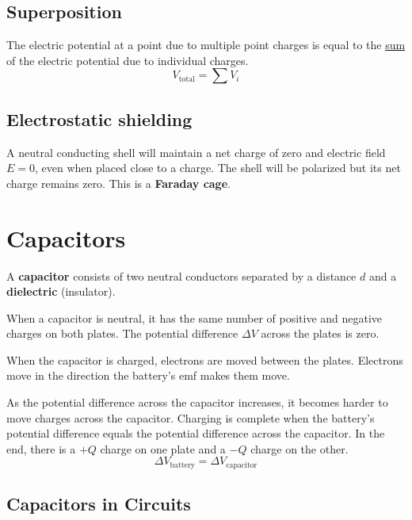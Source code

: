 \documentclass{article}
\newcommand{\definition}[1]{\begin{tcolorbox}[colback=red!5!white,colframe=red!75!black,parbox=false] #1 \end{tcolorbox}}
\newcommand{\theorem}[2]{\begin{tcolorbox}[title={#1},colback=blue!5!white,colframe=blue!75!black,parbox=false] #2 \end{tcolorbox}}
\begin{document}
\subsection{Superposition}

\theorem{Superposition}{
	The electric potential at a point due to multiple point charges is equal to the \ul{sum} of the electric potential due to individual charges.
	\begin{equation*}
		V_\text{total}=\sum V_i
	\end{equation*}
}

\subsection{Electrostatic shielding}

\definition{A neutral conducting shell will maintain a net charge of zero and electric field $E=0$, even when placed close to a charge. The shell will be polarized but its net charge remains zero. This is a \textbf{Faraday cage}.}

\section{Capacitors}

\definition{
	A \textbf{capacitor} consists of two neutral conductors separated by a distance $d$ and a \textbf{dielectric} (insulator).
}

When a capacitor is neutral, it has the same number of positive and negative charges on both plates. The potential difference $\Delta V$ across the plates is zero.

When the capacitor is charged, electrons are moved between the plates. Electrons move in the direction the battery's emf makes them move.

As the potential difference across the capacitor increases, it becomes harder to move charges across the capacitor. Charging is complete when the battery's potential difference equals the potential difference across the capacitor. In the end, there is a $+Q$ charge on one plate and a $-Q$ charge on the other.
\begin{equation*}
	\Delta V_\text{battery}=\Delta V_\text{capacitor}
\end{equation*}

\subsection{Capacitors in Circuits}
\end{document}
